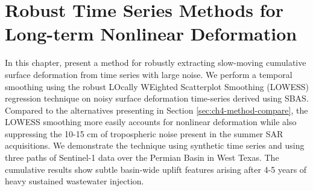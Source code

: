 %



\chapter{Robust Time Series Methods for Long-term Nonlinear Deformation}
\label{CHAP:5-robust-ts}


In this chapter, present a method for robustly extracting slow-moving cumulative surface deformation from time series with large noise. 
We perform a temporal smoothing using the robust LOcally WEighted Scatterplot Smoothing (LOWESS) regression technique \cite{Cleveland1979RobustLocallyWeighted} on noisy surface deformation time-series derived using SBAS.
Compared to the alternatives presenting in Section \ref{sec:ch4-method-compare}, the LOWESS smoothing more easily accounts for nonlinear deformation while also suppressing the 10-15 cm of tropospheric noise present in the summer SAR acquisitions. 
We demonstrate the technique using synthetic time series and using three paths of Sentinel-1 data over the Permian Basin in West Texas. 
The cumulative results show subtle basin-wide uplift features arising after 4-5 years of heavy sustained wastewater injection.



%	

